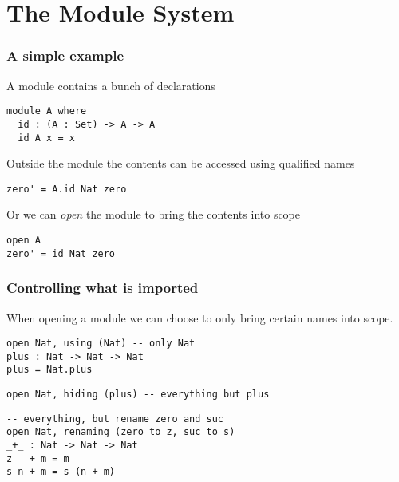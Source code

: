 \documentclass{beamer}
\newenvironment{agda}{
\begin{block}{}\small
}{
\end{block}
}
\begin{document}
\section{The Module System}


\begin{frame}[fragile]
\frametitle{A simple example}

A module contains a bunch of declarations

\begin{agda}
\begin{verbatim}
module A where
  id : (A : Set) -> A -> A
  id A x = x
\end{verbatim}
\end{agda}

Outside the module the contents can be accessed using qualified names

\begin{agda}
\begin{verbatim}
zero' = A.id Nat zero
\end{verbatim}
\end{agda}

Or we can {\em open} the module to bring the contents into scope

\begin{agda}
\begin{verbatim}
open A
zero' = id Nat zero
\end{verbatim}
\end{agda}

\end{frame}


\begin{frame}[fragile]
\frametitle{Controlling what is imported}

When opening a module we can choose to only bring certain names into scope.

\begin{agda}
\begin{verbatim}
open Nat, using (Nat) -- only Nat
plus : Nat -> Nat -> Nat
plus = Nat.plus
\end{verbatim}
\end{agda}
\begin{agda}
\begin{verbatim}
open Nat, hiding (plus) -- everything but plus
\end{verbatim}
\end{agda}
\begin{agda}
\begin{verbatim}
-- everything, but rename zero and suc
open Nat, renaming (zero to z, suc to s)
_+_ : Nat -> Nat -> Nat
z   + m = m
s n + m = s (n + m)
\end{verbatim}
\end{agda}

\end{frame}
\end{document}
